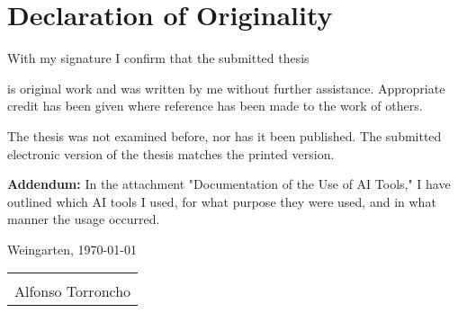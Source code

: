 \thispagestyle{empty} %
\section*{Declaration of Originality}

With my signature I confirm that the submitted thesis 

\large \batitle \normalsize

is original work and was written by me without further assistance. Appropriate credit has been given where reference has been made to the work of others.

The thesis was not examined before, nor has it been published. The submitted electronic version of the thesis matches the printed version.

\textbf{Addendum:} In the attachment "Documentation of the Use of AI Tools," I have outlined which AI tools I used, for what purpose they were used, and in what manner the usage occurred.

\mydate
Weingarten, \today

\vspace{2cm}

\begin{tabular}{p{6cm}}
\hrulefill \\
\centering Alfonso Torroncho\\
\end{tabular}